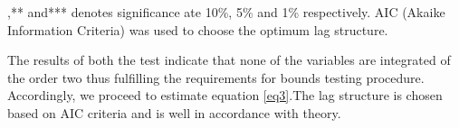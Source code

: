 \documentclass[a4paper,12pt]{article}
\begin{document}
\renewcommand{\arraystretch}{2.5}
\begin{table}[h]
	\large
	\begin{threeparttable}
\end{threeparttable}
\begin{tablenotes}
	\tiny
	\item *,** and*** denotes significance ate 10\%, 5\% and 1\% respectively. AIC (Akaike Information Criteria) was used to choose the optimum lag structure.
\end{tablenotes}
\caption{Unit-root tests}
\end{table}

The results of both the test indicate that none of the variables are integrated of the order two thus fulfilling the requirements for bounds testing procedure. Accordingly, we proceed to estimate equation \eqref{eq3}.The lag structure is chosen based on AIC criteria and is well in accordance with theory.
\end{document}
